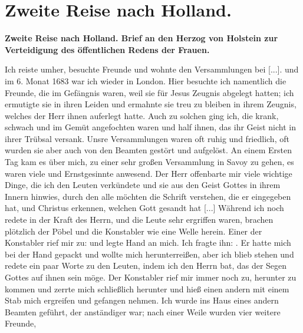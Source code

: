 

\chapter[Zweite Reise nach Holland.]{Zweite Reise nach Holland.}

\begin{center}
\textbf{Zweite Reise nach Holland. Brief an den Herzog von Holstein
zur Verteidigung des öffentlichen Redens der Frauen.}
\end{center}


Ich reiste umher, besuchte Freunde und wohnte den Versammlungen 
bei [...]. und im 6. Monat 1683 war ich wieder
in London. Hier besuchte ich namentlich die Freunde, die im
Gefängnis waren, weil sie für Jesus 
Zeugnis abgelegt hatten;
ich ermutigte sie in ihren Leiden und ermahnte sie treu zu bleiben
in ihrem Zeugnis, welches der Herr ihnen auferlegt hatte. Auch
zu solchen ging ich, die krank, schwach und im Gemüt angefochten
waren und half ihnen, das ihr Geist nicht in ihrer Trübsal 
versank. Unsre Versammlungen waren oft ruhig und friedlich, oft
wurden sie aber auch von den Beamten gestört und aufgelöst.
An einem Ersten Tag kam es über mich, zu einer sehr großen
Versammlung in Savoy zu gehen, es waren viele  und
Ernstgesinnte anwesend. Der Herr offenbarte mir viele wichtige
Dinge, die ich den Leuten verkündete und sie aus den Geist
Gottes in ihrem Innern hinwies, durch den alle möchten die
Schrift verstehen, die er 
eingegeben hat, und Christus erkennen,
welchen Gott gesandt hat [...] Während ich noch redete in der
Kraft des Herrn, und die Leute sehr ergriffen waren, brachen
plötzlich der Pöbel und die Konstabler wie eine Welle herein.
Einer der Konstabler rief mir zu:  und legte
Hand an mich. Ich fragte ihn: . Er hatte mich bei der Hand gepackt und wollte mich
herunterreißen, aber ich blieb stehen und redete ein paar Worte
zu den Leuten, indem ich den Herrn bat, das der Segen Gottes
auf ihnen sein möge. Der Konstabler rief mir immer noch zu,
herunter zu kommen und zerrte mich schließlich herunter und hieß
einen andern mit einem Stab mich ergreifen und gefangen nehmen.
Ich wurde ins Haus eines andern Beamten geführt, der anständiger 
war; nach einer Weile wurden vier weitere Freunde,
